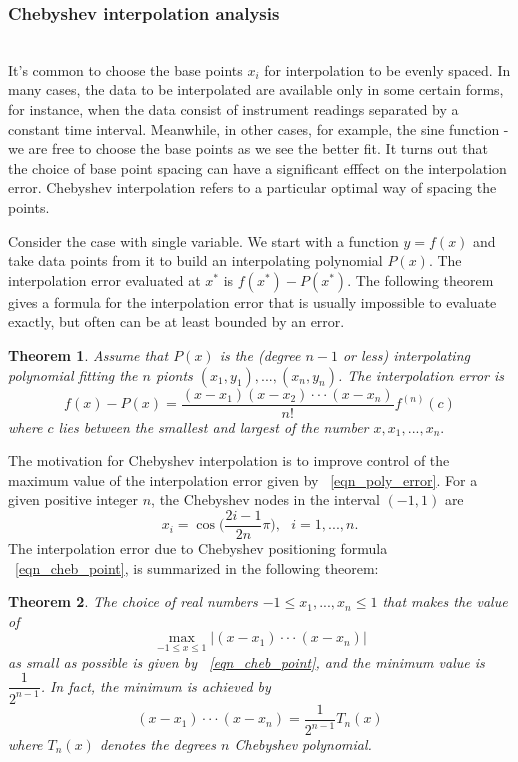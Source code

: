 \documentclass[11pt]{amsart}
\newtheorem{theorem}{Theorem}%
\theoremstyle{definition}
\begin{document}
\subsubsection{Chebyshev interpolation analysis}~\\
It's common to choose the base points $x_i$ for interpolation to be evenly spaced. In many cases, the data to be interpolated are available only in some certain forms, for instance, when the data consist of instrument readings separated by a constant time interval. Meanwhile, in other cases, for example, the sine function - we are free to choose the base points as we see the better fit. It turns out that the choice of base point spacing can have a significant efffect on the interpolation error. Chebyshev interpolation refers to a particular optimal way of spacing the points.

Consider the case with single variable. We start with a function $y=f(x)$ and take data points from it to build an interpolating polynomial $P(x)$. The interpolation error evaluated at $x^*$ is $f(x^*)-P(x^*)$. The following theorem gives a formula for the interpolation error that is usually impossible to evaluate exactly, but often can be at least bounded by an error.
\begin{theorem}
Assume that $P(x)$ is the (degree $n-1$ or less) interpolating polynomial fitting the $n$ pionts $(x_1,y_1),...,(x_n,y_n)$. The interpolation error is 
\begin{equation} \label{eqn_poly_error}
f(x)-P(x)=\frac{(x-x_1)(x-x_2)\cdot\cdot\cdot(x-x_n)}{n!}f^{(n)}(c)
\end{equation}
where $c$ lies between the smallest and largest of the number $x,x_1,...,x_n.$
\end{theorem}
The motivation for Chebyshev interpolation is to improve control of the maximum value of the interpolation error given by ~\eqref{eqn_poly_error}. For a given positive integer $n$, the Chebyshev nodes in the interval $(-1,1)$ are
\begin{equation}
\label{eqn_cheb_point}
x_i=\cos\Big(\frac{2i-1}{2n}\pi\Big),\mbox{ }i=1,...,n.
\end{equation}
The interpolation error due to Chebyshev positioning formula ~\eqref{eqn_cheb_point}, is summarized in the following theorem:
\begin{theorem}
The choice of real numbers $-1\le x_1,...,x_n\le 1$ that makes the value of 
\begin{equation}
\max_{-1 \leq x \leq 1}|(x-x_1)\cdot\cdot\cdot(x-x_n)|
\end{equation}
as small as possible is given by ~\eqref{eqn_cheb_point}, and the minimum value is $\dfrac{1}{2^{n-1}}$. In fact, the minimum is achieved by 
\begin{equation} \label{eqn_cheb_error}
(x-x_1)\cdot\cdot\cdot(x-x_n)=\frac{1}{2^{n-1}}T_n(x)
\end{equation}
where $T_n(x)$ denotes the degrees $n$ Chebyshev polynomial.
\end{theorem}
\end{document}
